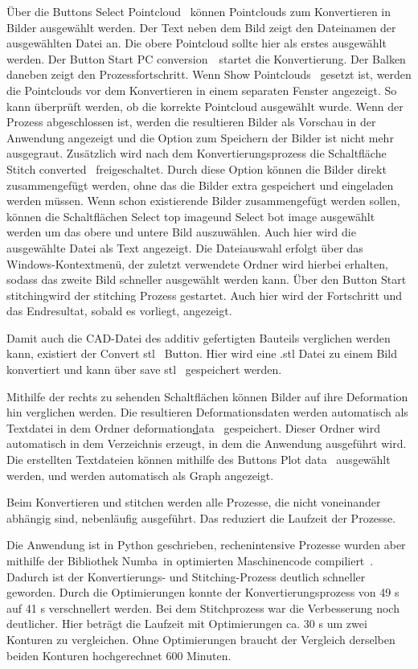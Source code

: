 Über die Buttons \glqq Select Pointcloud\grqq~ können Pointclouds zum Konvertieren in Bilder
ausgewählt werden. Der Text neben dem Bild zeigt den Dateinamen der ausgewählten 
Datei an. Die obere Pointcloud sollte hier als erstes ausgewählt werden.
Der Button \glqq Start PC conversion\grqq~~startet die Konvertierung. Der Balken 
daneben zeigt den Prozessfortschritt. 
Wenn \glqq Show Pointclouds\grqq~ gesetzt ist, werden die Pointclouds vor dem 
Konvertieren in einem separaten Fenster angezeigt. So kann überprüft werden, ob die 
korrekte Pointcloud ausgewählt wurde.
Wenn der Prozess abgeschlossen ist, werden die resultieren Bilder als Vorschau in der 
Anwendung angezeigt und die Option zum Speichern der Bilder ist nicht mehr ausgegraut.
Zusätzlich wird nach dem Konvertierungsprozess die Schaltfläche 
\glqq Stitch converted\grqq~ freigeschaltet. Durch diese Option können die 
Bilder direkt zusammengefügt werden, ohne das die Bilder extra gespeichert und 
eingeladen werden müssen. Wenn schon existierende Bilder zusammengefügt werden sollen, 
können die Schaltflächen \glqq Select top image\grqq und \glqq Select bot image\grqq
ausgewählt werden um das obere und untere Bild auszuwählen. Auch hier wird die 
ausgewählte Datei als Text angezeigt. Die Dateiauswahl erfolgt über das 
Windows-Kontextmenü, der zuletzt verwendete Ordner wird hierbei erhalten, sodass das 
zweite Bild schneller ausgewählt werden kann. 
Über den Button \glqq Start stitching\grqq wird der stitching Prozess gestartet. 
Auch hier wird der Fortschritt und das Endresultat, sobald es vorliegt, angezeigt.

Damit auch die CAD-Datei des additiv gefertigten Bauteils verglichen werden kann, 
existiert der \glqq Convert stl\grqq~ Button. Hier wird eine .stl Datei zu einem Bild 
konvertiert und kann über \glqq save stl\grqq~ gespeichert werden.

Mithilfe der rechts zu sehenden Schaltflächen können Bilder auf ihre Deformation hin 
verglichen werden. Die resultieren Deformationsdaten werden automatisch als Textdatei
in dem Ordner \glqq deformation\underline data\grqq~ gespeichert. Dieser Ordner wird automatisch 
in dem Verzeichnis erzeugt, in dem die Anwendung ausgeführt wird. 
Die erstellten Textdateien können mithilfe des Buttons \glqq Plot data\grqq~ ausgewählt 
werden, und werden automatisch als Graph angezeigt. 

Beim Konvertieren und stitchen werden alle Prozesse, die nicht voneinander abhängig sind,  
nebenläufig ausgeführt. Das reduziert die Laufzeit der Prozesse.

Die Anwendung ist in Python geschrieben, rechenintensive Prozesse wurden aber mithilfe 
der Bibliothek \glqq Numba\grqq~in optimierten Maschinencode compiliert~\cite{numba}.
Dadurch ist der Konvertierungs- und Stitching-Prozess deutlich schneller geworden. 
Durch die Optimierungen konnte der Konvertierungsprozess von 49 s auf 41 s verschnellert 
werden. Bei dem Stitchprozess war die Verbesserung noch deutlicher. Hier 
beträgt die Laufzeit mit Optimierungen ca. 30 s um zwei Konturen zu vergleichen. 
Ohne Optimierungen braucht der Vergleich derselben beiden Konturen 
hochgerechnet 600 Minuten.



